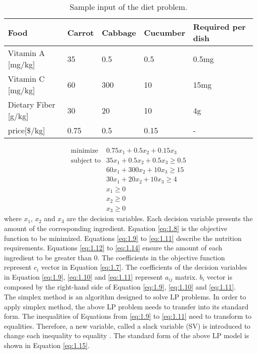 \begin{table} [ht!]
\begin{center}
\begin{tabular}{| l | l  l  l | l |}
\hline
Food & Carrot & Cabbage & Cucumber & Required per dish \\ \hline
Vitamin A [mg/kg] & 35 & 0.5 & 0.5 & 0.5mg \\ 
Vitamin C [mg/kg] & 60 & 300 & 10 & 15mg \\ 
Dietary Fiber [g/kg] & 30 & 20 & 10 & 4g \\ \hline
price[$\$$/kg] & 0.75 & 0.5 & 0.15 & - \\ \hline
\end{tabular} 
\end{center}
\caption{Sample input of the diet problem.}
\label{tab:1.1}
\end{table}	

\begin{eqnarray} 
\text{minimize} & 0.75x_{1} + 0.5x_{2} +  0.15x_{3}  \label{eq:1.8} \\
\text{subject to} & 35x_{1} + 0.5x_{2} + 0.5x_{3} \geq 0.5 \label{eq:1.9} \\
& 60x_{1} + 300x_{2} + 10x_{3} \geq 15 \label{eq:1.10} \\
& 30x_{1} + 20x_{2} + 10x_{3} \geq 4 \label{eq:1.11} \\
& x_{1} \geq 0  \label{eq:1.12} \\
& x_{2} \geq 0  \label{eq:1.13} \\
& x_{3} \geq 0  \label{eq:1.14}
\end{eqnarray} 
where $x_{1}$, $x_{2}$ and $x_{3}$ are the decision variables. Each decision variable presents the amount of the corresponding ingredient. Equation \ref{eq:1.8} is the objective function to be minimized. Equations \ref{eq:1.9} to  \ref{eq:1.11} describe the nutrition requirements. Equations \ref{eq:1.12} to \ref{eq:1.14} ensure the amount of each ingredient to be greater than 0. The coefficients in the objective function represent $c_{i}$ vector in Equation \ref{eq:1.7}. The coefficients of the decision variables in Equation \ref{eq:1.9}, \ref{eq:1.10} and \ref{eq:1.11} represent $a_{ij}$ matrix. $b_{i}$ vector is composed by the right-hand side of Equation \ref{eq:1.9}, \ref{eq:1.10} and \ref{eq:1.11}. \\

The simplex method is an algorithm designed to solve LP problems. In order to apply simplex method, the above LP problem needs to transfer into its standard form. The inequalities of Equations from \ref{eq:1.9} to \ref{eq:1.11} need to transform to equalities. Therefore, a new variable, called a slack variable (SV) is introduced to change each inequality to equality \cite{ConvexOptimization}. The standard form of the above LP model is shown in Equation \ref{eq:1.15}. 

